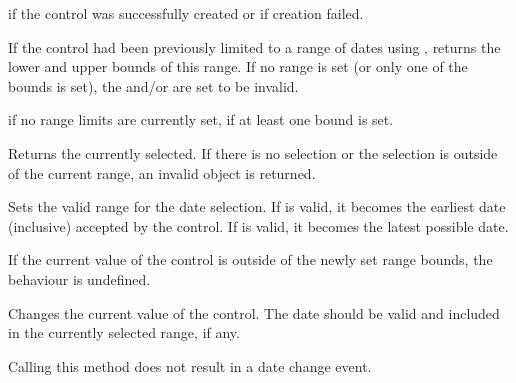 



\true if the control was successfully created or \false if creation failed.


\label{wxdatepickerctrlgetrange}


If the control had been previously limited to a range of dates using 
, returns the lower and upper
bounds of this range. If no range is set (or only one of the bounds is set),
the  and/or  are set to be invalid.





\false if no range limits are currently set, \true if at least one bound is
set.


\label{wxdatepickerctrlgetvalue}


Returns the currently selected. If there is no selection or the selection is
outside of the current range, an invalid object is returned.


\label{wxdatepickerctrlsetrange}


Sets the valid range for the date selection. If  is valid, it becomes
the earliest date (inclusive) accepted by the control. If  is valid,
it becomes the latest possible date.


If the current value of the control is outside of the newly set range bounds,
the behaviour is undefined.


\label{wxdatepickerctrlsetvalue}


Changes the current value of the control. The date should be valid and included
in the currently selected range, if any.

Calling this method does not result in a date change event.

